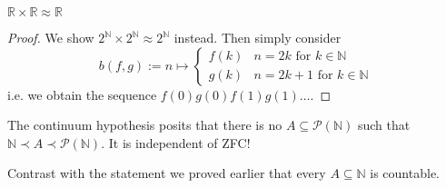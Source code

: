 \documentclass{whrartcl}
\newcommand{\NN}{\mathbb{N}}
\newcommand{\RR}{\mathbb{R}}
\newcommand{\pow}{\mathcal{P}}
\begin{document}
\begin{lemma}
  $\RR \times \RR \approx \RR$
\end{lemma}
\begin{proof}
  We show $2^\NN \times 2^\NN \approx 2^\NN$ instead. Then simply consider
  \[
    b(f, g) := n \mapsto
    \begin{cases}
      f(k) & n = 2k \text{ for } k \in \NN \\
      g(k) & n = 2k + 1 \text{ for } k \in \NN
    \end{cases}
  \]
  i.e. we obtain the sequence $f(0)g(0)f(1)g(1)\ldots$.
\end{proof}

\begin{remark}
  The continuum hypothesis posits that there is no $A \subseteq \pow(\NN)$ such
  that $\NN \prec A \prec \pow(\NN)$. It is independent of ZFC!

  Contrast with the statement we proved earlier that every $A \subseteq \NN$ is countable.
\end{remark}

\printbibliography{}
\end{document}
